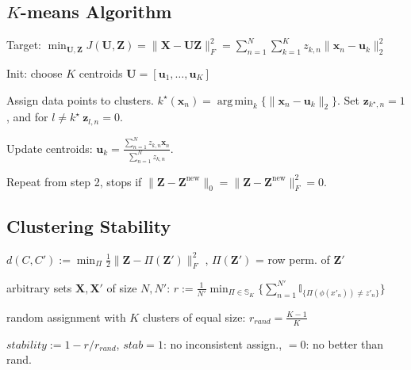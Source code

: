 \documentclass[a4paper, 11pt, landscape]{article}
\DeclareMathOperator*{\argmin}{arg\,min}
\begin{document}
\begin{multicols*}{3}
\section{$K$-means Algorithm}
\begin{inparadesc}
	\item[\color{red}Target:] $\min_{\mathbf{U}, \mathbf{Z}} J(\mathbf{U}, \mathbf{Z}) = \|\mathbf{X} - \mathbf{U} \mathbf{Z}\|_F^2 = \sum_{n=1}^N \sum_{k=1}^K z_{k,n} \|\mathbf{x}_n - \mathbf{u}_k\|_2^2$
\end{inparadesc}
\begin{inparaenum}
	\item Init: choose $K$ centroids $\mathbf{U} = [\mathbf{u}_1, \ldots, \mathbf{u}_K]$
	\item Assign data points to clusters. $k^\star(\mathbf{x}_n) = \argmin_k \{ \|\mathbf{x}_n - \mathbf{u}_k\|_2 \}$. Set $\mathbf{z}_{k^\star,n} = 1$, and for $ l \neq k^\star~ \mathbf{z}_{l,n}=0$.
	\item Update centroids: $\mathbf{u}_k = \frac{\sum_{n=1}^N z_{k,n} \mathbf{x}_n}{\sum_{n=1}^N z_{k,n}}$.
	\item Repeat from step 2, stops if $\|\mathbf{Z} - \mathbf{Z}^\text{new}\|_0 = \|\mathbf{Z} - \mathbf{Z}^\text{new}\|^2_F = 0$.
\end{inparaenum}

\subsection{Clustering Stability}
\begin{inparaitem}[\color{red}\textbullet]
  \item $d(C,C') := \min_\Pi \frac{1}{2}\|\mathbf{Z}-\Pi(\mathbf{Z}')\|^2_F$ , $\Pi(\mathbf{Z}
')$ = row perm. of $\mathbf{Z}'$
  \item arbitrary sets $\mathbf{X},\mathbf{X'}$ of size $N,N'$: $r := \frac{1}{N'} \min_{\Pi \in \mathbb{S}_K} \{ \sum_{n=1}^{N'} \mathbb{I}_{\{\Pi(\phi(x'_n)) \neq z'_n\} } \}$
  \item random assignment with $K$ clusters of equal size: $r_{rand} = \frac{K-1}{K}$
  \item $stability := 1-r/r_{rand}$, $stab = 1$: no inconsistent assign., $= 0$: no better than rand.
\end{inparaitem}


\end{multicols*}
\end{document}

